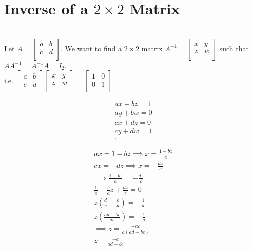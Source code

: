 \documentclass{report}
\begin{document}
\section{Inverse of a $2\times 2$ Matrix}\\
Let $A = \begin{bmatrix}
a & b\\
c & d\\
\end{bmatrix}$. We want to find a $2\times 2$ matrix $A^{-1}= \begin{bmatrix}
x & y\\
z & w\\
\end{bmatrix}$ such that $A A^{-1}= A^{-1}A= I_2$.\\
i.e. $\begin{bmatrix}
a & b\\
c & d\\
\end{bmatrix}\begin{bmatrix}
x & y\\
z & w\\
\end{bmatrix}= \begin{bmatrix}
1 & 0\\
0 & 1\\
\end{bmatrix}$
\begin{multicols}{2}
\begin{align*}
        ax+bz=1\\
        ay+bw=0\\
        cx+dz=0\\
        cy+dw=1\\
.\end{align*}

\break
\begin{align*}
        ax=1-bz \implies x= \frac{1-bz}{a}\\
        cx=-dz \implies x= - \frac{dz}{c}\\
        \implies \frac{1-bz}{a}= - \frac{dz}{c}\\
        \frac{1}{a} - \frac{b}{a}z + \frac{dz}{c}=0\\
        z \left( \frac{d}{c}-\frac{b}{a} \right) = - \frac{1}{a}\\
        z \left( \frac{ad-bc}{ac} \right) =-\frac{1}{a}\\
        \implies z= \frac{-ac}{a \left( ad-bc \right) }\\
        z= \frac{-c}{ad-bc}
.\end{align*}
\end{multicols}
\end{document}
